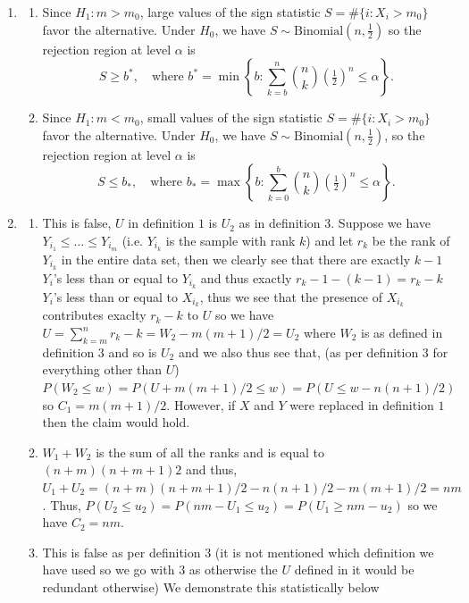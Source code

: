 \documentclass[12pt, english]{article}\usepackage[]{graphicx}\usepackage[]{xcolor}
\newenvironment{knitrout}{}{} %
\begin{document}
\begin{enumerate}[label=\arabic*.]
\item	
	\begin{enumerate}[label=(\alph*)]
	\item Since $H_1 : m > m_0$, large values of the sign statistic $S = \#\{i : X_i > m_0\}$ favor the alternative.
	Under $H_0$, we have $S \sim \mathrm{Binomial}(n, \tfrac{1}{2})$ so the rejection region at level $\alpha$ is
	\[
    	S \geq b^*, \quad \text{where } b^* = \min\left\{ b : \sum_{k=b}^{n} \binom{n}{k} \left(\tfrac{1}{2}\right)^n \leq \alpha \right\}.
	\]
	\item Since $H_1 : m < m_0$, small values of the sign statistic $S = \#\{i : X_i > m_0\}$ favor the alternative.
	Under $H_0$, we have $S \sim \mathrm{Binomial}(n, \tfrac{1}{2})$, so the rejection region at level $\alpha$ is
	\[
	    S \leq b_*, \quad \text{where } b_* = \max\left\{ b : \sum_{k=0}^{b} \binom{n}{k} \left(\tfrac{1}{2}\right)^n \leq \alpha \right\}.
	\]
	\end{enumerate}
\item 
	\begin{enumerate}[label=(\alph*)]
		\item This is false, $U$ in definition $1$ is $U_2$ as in definition $3$. Suppose we have $Y_{i_1}\leq\ldots\leq Y_{i_m}$ (i.e. $Y_{i_k}$ is the sample with rank $k$) and let $r_k$ be the rank of $Y_{i_k}$ in the entire data set, then we clearly see that there are exactly $k-1$ $Y_i$'s less than or equal to $Y_{i_k}$ and thus exactly $r_k-1-(k-1)=r_k-k$ $Y_i$'s less than or equal to $X_{i_k}$, thus we see that the presence of $X_{i_k}$ contributes exaclty $r_k-k$ to $U$ so we have $U=\sum_{k=m}^nr_k-k=W_2-m(m+1)/2=U_2$ where $W_2$ is as defined in definition $3$ and so is $U_2$ and we also thus see that, (as per definition $3$ for everything other than $U$) $P(W_2\leq w)=P(U+m(m+1)/2\leq w)=P(U\leq w-n(n+1)/2)$ so $C_1=m(m+1)/2.$ 
			However, if $X$ and $Y$ were replaced in definition $1$ then the claim would hold.
		\item $W_1+W_2$ is the sum of all the ranks and is equal to $(n+m)(n+m+1)2$ and thus, $U_1+U_2=(n+m)(n+m+1)/2-n(n+1)/2-m(m+1)/2=nm$. 
			Thus, $P(U_2\leq u_2)=P(nm-U_1\leq u_2)=P(U_1\geq nm-u_2)$ so we have $C_2=nm.$
		\item This is false as per definition $3$ (it is not mentioned which definition we have used so we go with $3$ as otherwise the $U$ defined in it would be redundant otherwise)
			We demonstrate this statistically below 
\begin{knitrout}

\end{knitrout}
\end{enumerate}
\end{enumerate}
\end{document}
